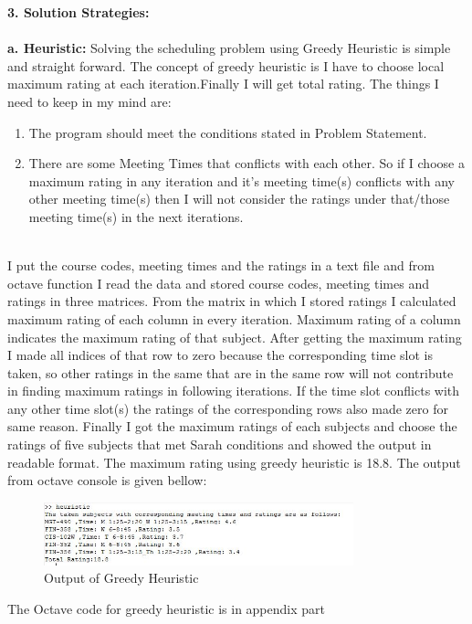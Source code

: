\documentclass[paper=letter, fontsize=11pt]{scrartcl} %
\begin{document}
\Large \textbf{3. Solution Strategies:}
\\ 
\\
\normalsize \textbf{a. Heuristic:}
Solving the scheduling problem using Greedy Heuristic is simple and straight forward. The concept of greedy heuristic is 
I have to choose local maximum rating at each iteration.Finally I will get total rating. The things I need to keep in 
my mind are:  
\begin{enumerate}
\item The program should meet the conditions stated in Problem Statement.
\item There are some Meeting Times that conflicts with each other. So if I choose a maximum rating in any iteration and
it's meeting time(s) conflicts with any other meeting time(s) then I will not consider the ratings under that/those 
meeting time(s) in the next iterations.
\end{enumerate}  \\
I put the course codes, meeting times and the ratings in a text file and from octave function I read the data and stored course codes, meeting times and ratings in three matrices. From the matrix in which I stored ratings I calculated maximum rating of each column in every iteration. Maximum rating of a column indicates the maximum rating of that subject. After getting the maximum rating I made all indices of that row to zero because the corresponding time slot is taken, so other ratings in the same that are in the same row will not contribute in finding maximum ratings in following iterations. If the time slot conflicts with any other time slot(s) the ratings of the corresponding rows also made zero for same reason. Finally I got the maximum ratings of each subjects and choose the ratings of five subjects that met Sarah conditions and showed the output in readable format. The maximum rating using greedy heuristic is 18.8.
The output from octave console is given bellow:

\begin{figure}[h!]
  
  \centering
    \includegraphics[width=0.8\textwidth]{heuristic}
    \caption{Output of Greedy Heuristic}
\end{figure}

The Octave code for greedy heuristic is  in appendix part
\end{document}
